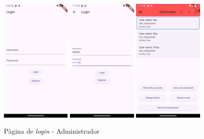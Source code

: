 \documentclass[a4paper,12pt,twoside]{ThesisStyle}
\begin{document}
\begin{figure}[h]
    \centering
    \includegraphics[width=0.31\textwidth]{imatges/login.png}
    \includegraphics[width=0.31\textwidth]{imatges/loginAdmin.png}
    \includegraphics[width=0.31\textwidth]{imatges/administer.png}
    \caption{Pàgina de \textit{login} - Administrador}
    \label{fig: Pàgina de login - Admin}
\end{figure}
\end{document}
